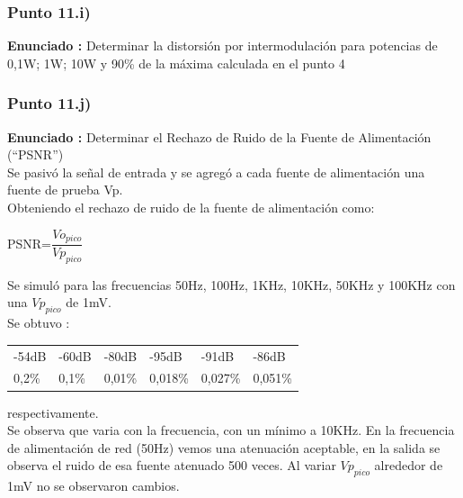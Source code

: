 \documentclass[12pt]{book}
\begin{document}
\subsubsection{Punto 11.i)}
\textbf{Enunciado : } Determinar la distorsión por intermodulación para potencias de 0,1W; 1W; 10W y 90\% de la máxima calculada en el punto 4\\[1cm]

\subsubsection{Punto 11.j)}
\textbf{Enunciado : } Determinar el Rechazo de Ruido de la Fuente de Alimentación (“PSNR”)\\[1cm]
Se pasivó la señal de entrada y se agregó a cada fuente de alimentación una fuente de prueba Vp.\\
Obteniendo el rechazo de ruido de la fuente de alimentación como:
\begin{center}
PSNR=$\dfrac{Vo_{pico}}{Vp_{pico}}$
\end{center}
Se simuló para las frecuencias 50Hz, 100Hz, 1KHz, 10KHz, 50KHz y 100KHz con una $Vp_{pico}$ de 1mV.\\
Se obtuvo :
\begin{center}
\begin{tabular}{llllll}
-54dB&-60dB&-80dB&-95dB&-91dB&-86dB\\
0,2\%&0,1\%&0,01\%&0,018\%&0,027\%&0,051\%\\
\end{tabular}
\end{center}
respectivamente.\\
Se observa que varia con la frecuencia, con un mínimo a 10KHz. En la frecuencia de alimentación de red (50Hz) vemos una atenuación aceptable, en la salida se observa el ruido de esa fuente atenuado 500 veces. Al variar $Vp_{pico}$ alrededor de 1mV no se observaron cambios.
\end{document}
